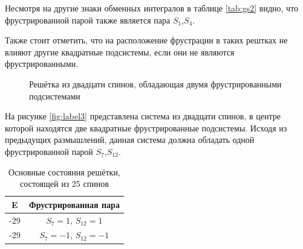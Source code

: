 \documentclass[utf8, babel, sor, jor, amsmath,amssymb, reprint]{elsarticle} %
\begin{document}
Несмотря на другие знаки обменных интегралов в таблице \eqref{tab:gs2} видно, что фрустрированной парой также является пара $S_1$,$S_4$.

Также стоит отметить, что на расположение фрустрации в таких рештках не влияют другие квадратные подсистемы, если они не являются фрустрированными.

\begin{figure}[h]
	\centering
	\caption{Решётка из двадцати спинов, обладающая двумя фрустрированными подсистемами}
	\label{fig:label3}
\end{figure}

На рисунке \eqref{fig:label3} представлена система из двадцати спинов, в центре которой находятся две квадратные фрустрированные подсистемы. Исходя из предыдущих размышлений, данная система должна обладать одной фрустрированной парой  $S_7$,$S_12$.

\begin{table}[h]
	\centering
	\begin{tabular}{|c|c|}
		\hline
		E   &   Фрустрированная пара \\
		\hline
		-29   &  $S_7=1$, $S_{12}=1$ \\
		\hline
		-29   &   $S_7=-1$, $S_{12}=-1$ \\
		\hline
	\end{tabular}
	\caption{Основные состояния решётки, состоящей из 25 спинов}
	\label{tab:gs3}
\end{table}
\end{document}
